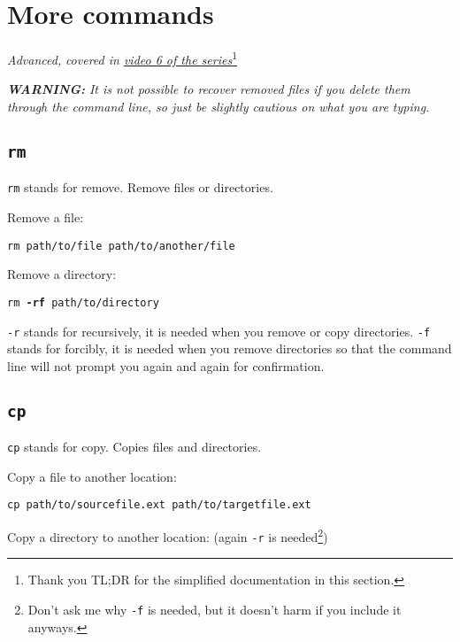 \section{More commands}
\label{sec:rmcpmv}
\textit{Advanced,}
\textit{covered in \href{https://www.youtube.com/watch?v=U0bDr7b2cOM&list=PLjGmdnqrOKuYXiu7lgG5HW71jPEUd1XCm&index=8}{video 6 of the series}}\footnote{Thank you TL;DR for the simplified documentation in this section.}

\textit{\textbf{WARNING:} It is not possible to recover removed files if you delete them through the command line, so just be slightly cautious on what you are typing.}
\vspace{6mm}

\subsection{\texttt{rm}}

\texttt{rm} stands for remove. Remove files or directories.
\vspace{6mm}

Remove a file: 

\texttt{rm path/to/file path/to/another/file}
\vspace{6mm}

Remove a directory:

\texttt{rm \textbf{-rf} path/to/directory}
\vspace{6mm}

\texttt{-r} stands for recursively, it is needed when you remove or copy directories. \texttt{-f} stands for forcibly, it is needed when you remove directories so that the command line will not prompt you again and again for confirmation.

\subsection{\texttt{cp}}

\texttt{cp} stands for copy. Copies files and directories.
\vspace{6mm}

Copy a file to another location:

\texttt{cp path/to/source\textunderscore file.ext path/to/target\textunderscore file.ext}
\vspace{6mm}

Copy a directory to another location: (again \texttt{-r} is needed\footnote{Don't ask me why \texttt{-f} is needed, but it doesn't harm if you include it anyways.})

